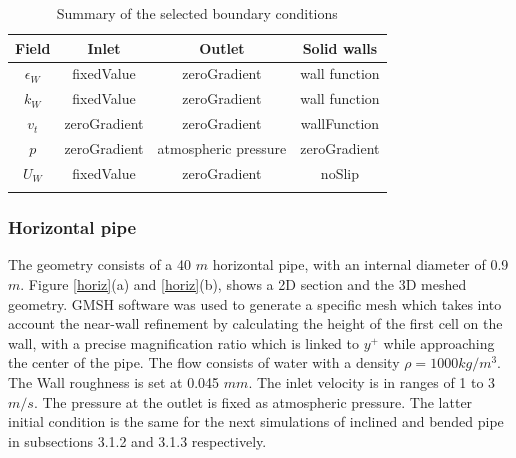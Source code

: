 \documentclass[review,3p,times,12pt]{elsarticle}
\begin{document}
\begin{table}[H]
\begin{center}
\caption{Summary of the selected boundary conditions}
\begin{tabular}{cccc}
\hline Field & Inlet & Outlet & Solid walls  \\
\hline
\(\epsilon_{W}\) & fixedValue & zeroGradient & wall function\\
\(k_{W}\) & fixedValue & zeroGradient & wall function \\
\(v_{t}\) & zeroGradient & zeroGradient & wallFunction \\
\(p\) & zeroGradient & atmospheric pressure & zeroGradient  \\
\(U_W\) & fixedValue  & zeroGradient & noSlip \\
\hline
\label{table 2}
\end{tabular}
\end{center}
\end{table}

\subsubsection{Horizontal pipe}
The geometry consists of a 40 $m$ horizontal pipe, with an internal diameter of 0.9 $m$. Figure \ref{horiz}(a) and \ref{horiz}(b), shows a 2D section and the 3D meshed geometry. GMSH software was used to generate a specific mesh which takes into account the near-wall refinement by calculating the height of the first cell on the wall, with a precise magnification ratio which is linked to $y^{+}$ while approaching the center of the pipe. The flow consists of water with a density $\rho=1000 kg/m^3$. The Wall roughness is set at 0.045 $mm$. The inlet velocity is in ranges of 1 to 3 $m/s$. The pressure at the outlet is fixed as atmospheric pressure. The latter initial condition is the same for the next simulations of inclined and bended pipe in subsections 3.1.2 and 3.1.3 respectively.
\end{document}
